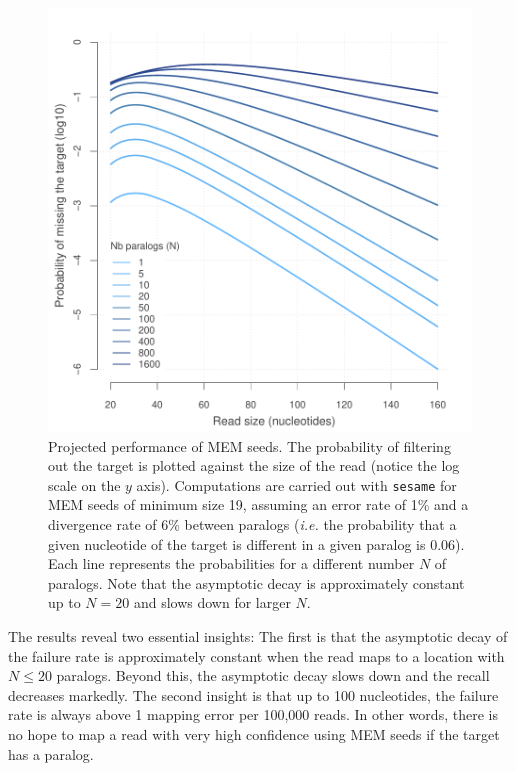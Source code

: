 \documentclass[a4,center,fleqn]{NAR}
\begin{document}
\begin{figure}[t]
\begin{center}
\includegraphics[scale=.6]{MEM_19.pdf}
\end{center}
\caption{Projected performance of MEM seeds. The probability of filtering
out the target is plotted against the size of the read (notice the log
scale on the $y$ axis). Computations are carried out with \texttt{sesame}
for MEM seeds of minimum size 19, assuming an error rate of 1\% and a
divergence rate of 6\% between paralogs (\textit{i.e.} the probability
that a given nucleotide of the target is different in a given paralog is
0.06). Each line represents the probabilities for a different number $N$
of paralogs. Note that the asymptotic decay is approximately constant up
to $N = 20$ and slows down for larger $N$.}
\label{fig_MEM}
\end{figure}

The results reveal two essential insights: The first is that the
asymptotic decay of the failure rate is approximately constant when the
read maps to a location with $N \leq 20$ paralogs. Beyond this, the
asymptotic decay slows down and the recall decreases markedly. The second
insight is that up to 100 nucleotides, the failure rate is always above 1
mapping error per 100,000 reads. In other words, there is no hope to map a
read with very high confidence using MEM seeds if the target has a
paralog.
\end{document}

